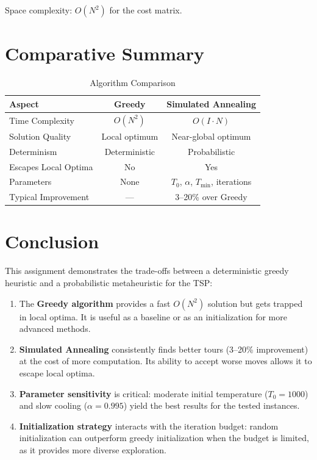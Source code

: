 \documentclass[12pt,a4paper]{article}
\begin{document}
Space complexity: $O(N^2)$ for the cost matrix.

\section{Comparative Summary}

\begin{table}[H]
\centering
\caption{Algorithm Comparison}
\begin{tabular}{@{}lcc@{}}
\toprule
\textbf{Aspect} & \textbf{Greedy} & \textbf{Simulated Annealing} \\
\midrule
Time Complexity & $O(N^2)$ & $O(I \cdot N)$ \\
Solution Quality & Local optimum & Near-global optimum \\
Determinism & Deterministic & Probabilistic \\
Escapes Local Optima & No & Yes \\
Parameters & None & $T_0$, $\alpha$, $T_{\min}$, iterations \\
Typical Improvement & --- & 3--20\% over Greedy \\
\bottomrule
\end{tabular}
\end{table}

\section{Conclusion}

This assignment demonstrates the trade-offs between a deterministic greedy heuristic and a probabilistic metaheuristic for the TSP:

\begin{enumerate}
    \item The \textbf{Greedy algorithm} provides a fast $O(N^2)$ solution but gets trapped in local optima. It is useful as a baseline or as an initialization for more advanced methods.
    \item \textbf{Simulated Annealing} consistently finds better tours (3--20\% improvement) at the cost of more computation. Its ability to accept worse moves allows it to escape local optima.
    \item \textbf{Parameter sensitivity} is critical: moderate initial temperature ($T_0 = 1000$) and slow cooling ($\alpha = 0.995$) yield the best results for the tested instances.
    \item \textbf{Initialization strategy} interacts with the iteration budget: random initialization can outperform greedy initialization when the budget is limited, as it provides more diverse exploration.
\end{enumerate}
\end{document}
